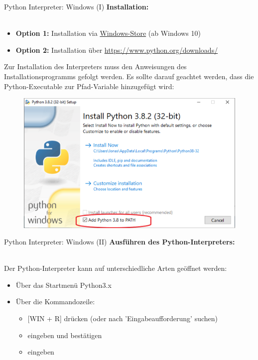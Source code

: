    
    \begin{frame}{Python Interpreter: Windows (I)}
        \textbf{Installation:}\\~\
        
        \begin{itemize}
            \item \textbf{Option 1:} Installation via \href{https://www.microsoft.com/de-de/p/python-39/9p7qfqmjrfp7}{Windows-Store} (ab Windows 10)
            \item \textbf{Option 2:} Installation über \href{https://www.python.org/downloads/}{https://www.python.org/downloads/}
        \end{itemize}
        
        Zur Installation des Interpreters muss den Anweisungen des Installationsprogramms gefolgt werden.
        Es sollte darauf geachtet werden, dass die Python-Executable zur Pfad-Variable hinzugefügt wird:
        
         \begin{figure}
            \centering
            \includegraphics[width=0.8\linewidth,height=0.5\textheight,keepaspectratio]{chapters/06_python1_introduction/figures/python_path.png}
        \end{figure}
    \end{frame}
    
\begin{frame}{Python Interpreter: Windows (II)}
            \textbf{Ausführen des Python-Interpreters:} \\~\
        
Der Python-Interpreter kann auf unterschiedliche Arten geöffnet werden:
        \begin{itemize}
            \item Über das Startmenü \textrightarrow Python3.x
            \item Über die Kommandozeile: 
            \begin{itemize}
                \item{[WIN + R] drücken (oder nach 'Eingabeaufforderung' suchen)}
                \item {} eingeben und bestätigen
                \item {} eingeben
            \end{itemize} 
        \end{itemize}
\end{frame}
    
